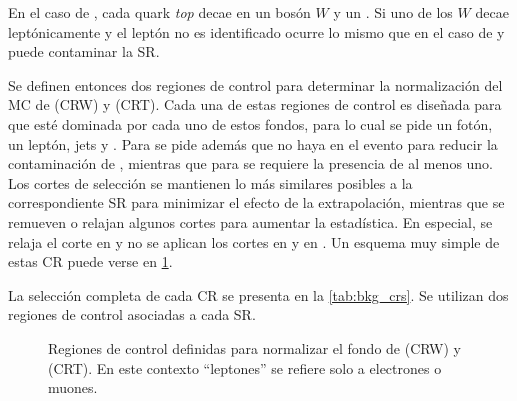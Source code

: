 En el caso de {\ttgam}, cada quark \emph{top} decae en un bosón $W$ y un
{\bjet}. Si uno de los $W$ decae leptónicamente y el leptón no es identificado
ocurre lo mismo que en el caso de {\wgam} y puede contaminar la SR.

Se definen entonces dos regiones de control para determinar la normalización del
MC de {\wgam} (CRW) y {\ttgam} (CRT). Cada una de estas regiones de control es
diseñada para que esté dominada por cada uno de estos fondos, para lo cual se
pide un fotón, un leptón, jets y \met. Para {\CRW} se pide además que no haya
{\bjets} en el evento para reducir la contaminación de {\ttgam}, mientras que
para {\CRT} se requiere la presencia de al menos uno.
Los cortes de selección se mantienen lo
más similares posibles a la correspondiente SR para minimizar el efecto de la
extrapolación, mientras que se remueven o relajan
algunos cortes para aumentar la estadística. En especial, se relaja el corte en
{\met} y no se aplican los cortes en {\HT} y en {\rt}. Un esquema muy simple de
estas CR puede verse en \cref{fig:bkg_crt_crw}.

La selección completa de cada CR se presenta en la \cref{tab:bkg_crs}. Se utilizan
dos regiones de control asociadas a cada SR.

\begin{figure}[!htbp]
  \centering

  \resizebox{0.5\textwidth}{!}{}

  \caption{Regiones de control definidas para normalizar el fondo de
    {\wgam} (CRW) y {\ttgam} (CRT). En este contexto ``leptones'' se
    refiere solo a electrones o muones.}
  \label{fig:bkg_crt_crw}
\end{figure}




